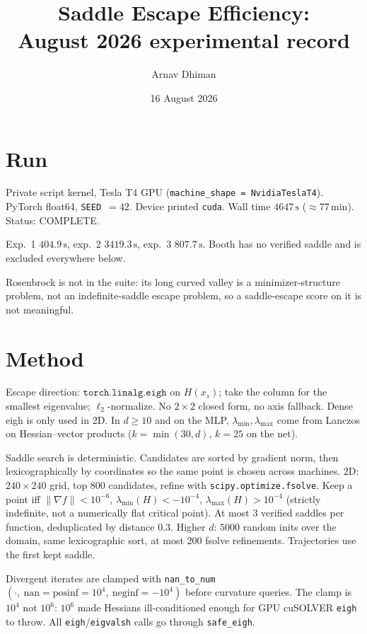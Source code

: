 \documentclass[11pt]{article}
\title{Saddle Escape Efficiency:\\August 2026 experimental record}
\author{Arnav Dhiman}
\date{16 August 2026}
\begin{document}
\maketitle

\section{Run}

Private script kernel, Tesla T4 GPU (\texttt{machine\_shape = NvidiaTeslaT4}).
PyTorch float64, \texttt{SEED $= 42$}. Device printed \texttt{cuda}.
Wall time $4647\,\mathrm{s}$ ($\approx 77\,\mathrm{min}$). Status: COMPLETE.

Exp.~1 $404.9\,\mathrm{s}$, exp.~2 $3419.3\,\mathrm{s}$, exp.~3 $807.7\,\mathrm{s}$.
Booth has no verified saddle and is excluded everywhere below.

Rosenbrock is not in the suite: its long curved valley is a minimizer-structure
problem, not an indefinite-saddle escape problem, so a saddle-escape score on
it is not meaningful.

\section{Method}

Escape direction: $\texttt{torch.linalg.eigh}$ on $H(x_s)$; take the column
for the smallest eigenvalue; $\ell_2$-normalize. No $2\times 2$ closed form,
no axis fallback. Dense eigh is only used in 2D. In $d\ge 10$ and on the MLP,
$\lambda_{\min},\lambda_{\max}$ come from Lanczos on Hessian--vector products
($k=\min(30,d)$, $k=25$ on the net).

Saddle search is deterministic. Candidates are sorted by gradient norm, then
lexicographically by coordinates so the same point is chosen across machines.
2D: $240\times 240$ grid, top $800$ candidates, refine with
\texttt{scipy.optimize.fsolve}. Keep a point iff
$\lVert\nabla f\rVert < 10^{-6}$, $\lambda_{\min}(H) < -10^{-4}$,
$\lambda_{\max}(H) > 10^{-4}$ (strictly indefinite, not a numerically flat
critical point). At most $3$ verified saddles per function, deduplicated by
distance $0.3$. Higher $d$: $5000$ random inits over the domain, same
lexicographic sort, at most $200$ fsolve refinements. Trajectories use the
first kept saddle.

Divergent iterates are clamped with
\texttt{nan\_to\_num}$(\cdot,\ \mathrm{nan}=\mathrm{posinf}=10^{4},\ \mathrm{neginf}=-10^{4})$
before curvature queries. The clamp is $10^{4}$ not $10^{6}$: $10^{6}$ made
Hessians ill-conditioned enough for GPU cuSOLVER \texttt{eigh} to throw.
All \texttt{eigh}/\texttt{eigvalsh} calls go through \texttt{safe\_eigh}.
\end{document}
